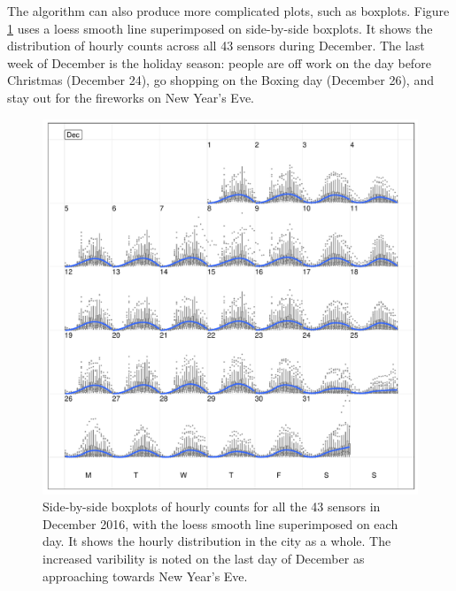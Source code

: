 \documentclass[12pt]{article}
\begin{document}
The algorithm can also produce more complicated plots, such as boxplots. Figure \ref{fig:boxplot} uses a loess smooth line \citep{cleveland1979loess} superimposed on side-by-side boxplots. It shows the distribution of hourly counts across all 43 sensors during December. The last week of December is the holiday season: people are off work on the day before Christmas (December 24), go shopping on the Boxing day (December 26), and stay out for the fireworks on New Year's Eve.

\begin{figure}

{\centering \includegraphics[width=\textwidth]{figure/boxplot-1} 

}

\caption{Side-by-side boxplots of hourly counts for all the 43 sensors in December 2016, with the loess smooth line superimposed on each day. It shows the hourly distribution in the city as a whole. The increased varibility is noted on the last day of December as approaching towards New Year's Eve.}\label{fig:boxplot}
\end{figure}
\end{document}
